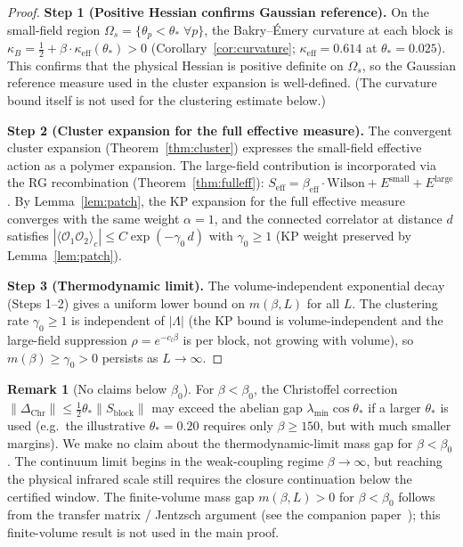 \documentclass[11pt]{article}
\theoremstyle{definition}
\newtheorem{remark}[theorem]{Remark}
\begin{document}
\begin{proof}
\textbf{Step 1 (Positive Hessian confirms Gaussian reference).}
On the small-field region $\Omega_s=\{\theta_p<\theta_*\;\forall p\}$,
the Bakry--\'Emery curvature at each block is
$\kappa_B=\frac{1}{2}+\beta\cdot\kappa_{\mathrm{eff}}(\theta_*)>0$
(Corollary~\ref{cor:curvature};
$\kappa_{\mathrm{eff}}=0.614$ at $\theta_*=0.025$).
This confirms that the physical Hessian is positive definite
on $\Omega_s$, so the Gaussian reference measure used in
the cluster expansion is well-defined.  (The curvature bound
itself is not used for the clustering estimate below.)

\textbf{Step 2 (Cluster expansion for the full effective measure).}
The convergent cluster expansion (Theorem~\ref{thm:cluster})
expresses the small-field effective action as a polymer expansion.
The large-field contribution is incorporated via the RG recombination
(Theorem~\ref{thm:fulleff}): $S_{\mathrm{eff}}
=\beta_{\mathrm{eff}}\cdot\text{Wilson}+E^{\mathrm{small}}
+E^{\mathrm{large}}$.  By Lemma~\ref{lem:patch},
the KP expansion for the full effective measure
converges with the same weight $\alpha=1$, and the connected
correlator at distance $d$ satisfies
$|\langle\mathcal{O}_1\mathcal{O}_2\rangle_c|
\le C\exp(-\gamma_0\,d)$
with $\gamma_0\ge 1$ (KP weight preserved by
Lemma~\ref{lem:patch}).

\textbf{Step 3 (Thermodynamic limit).}
The volume-independent exponential decay (Steps 1--2) gives
a uniform lower bound on $m(\beta,L)$ for all $L$.
The clustering rate $\gamma_0\ge 1$ is independent of
$|\Lambda|$ (the KP bound is volume-independent and the
large-field suppression $\rho=e^{-c_l\beta}$ is per block,
not growing with volume), so
$m(\beta)\ge\gamma_0>0$ persists
as $L\to\infty$.
\end{proof}

\begin{remark}[No claims below $\beta_0$]
For $\beta<\beta_0$, the Christoffel correction
$\|\Delta_{\mathrm{Chr}}\|\le\frac{1}{2}\theta_*\|S_{\mathrm{block}}\|$
may exceed the abelian gap $\lambda_{\min}\cos\theta_*$
if a larger $\theta_*$ is used (e.g.\ the illustrative
$\theta_*=0.20$ requires only $\beta\ge 150$, but
with much smaller margins).
We make no claim about the thermodynamic-limit mass gap for
$\beta<\beta_0$.  The continuum limit begins in the weak-coupling
regime $\beta\to\infty$, but reaching the physical infrared scale
still requires the closure continuation below the certified window.
The finite-volume mass gap $m(\beta,L)>0$ for $\beta<\beta_0$
follows from the transfer matrix / Jentzsch argument
(see the companion paper~\cite{companion}); this finite-volume
result is not used in the main proof.
\end{remark}
\end{document}
